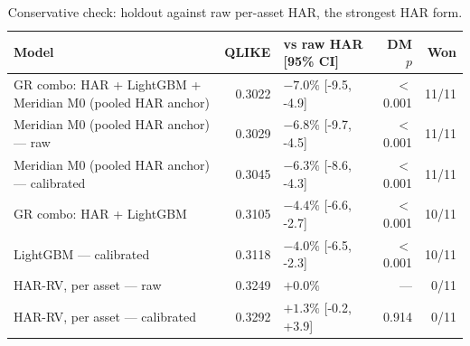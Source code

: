 \begin{table}[!htbp]
\centering
\small
\caption{Conservative check: holdout against raw per-asset HAR, the strongest HAR form.}
\label{tab:volcons}
\begin{tabularx}{\linewidth}{X r l r r}
\toprule
\textbf{Model} & \textbf{QLIKE} & \textbf{vs raw HAR [95\% CI]} & \textbf{DM $p$} & \textbf{Won} \\
\midrule
\rowcolor{good}GR combo: HAR + LightGBM + Meridian M0 (pooled HAR anchor) & 0.3022 & $-7.0\%$ [-9.5, -4.9] & $<$0.001 & 11/11 \\
\rowcolor{good}Meridian M0 (pooled HAR anchor) --- raw & 0.3029 & $-6.8\%$ [-9.7, -4.5] & $<$0.001 & 11/11 \\
\rowcolor{good}Meridian M0 (pooled HAR anchor) --- calibrated & 0.3045 & $-6.3\%$ [-8.6, -4.3] & $<$0.001 & 11/11 \\
GR combo: HAR + LightGBM & 0.3105 & $-4.4\%$ [-6.6, -2.7] & $<$0.001 & 10/11 \\
LightGBM --- calibrated & 0.3118 & $-4.0\%$ [-6.5, -2.3] & $<$0.001 & 10/11 \\
HAR-RV, per asset --- raw & 0.3249 & $+0.0\%$  & --- & 0/11 \\
HAR-RV, per asset --- calibrated & 0.3292 & $+1.3\%$ [-0.2, +3.9] & 0.914 & 0/11 \\
\bottomrule
\end{tabularx}
\end{table}
